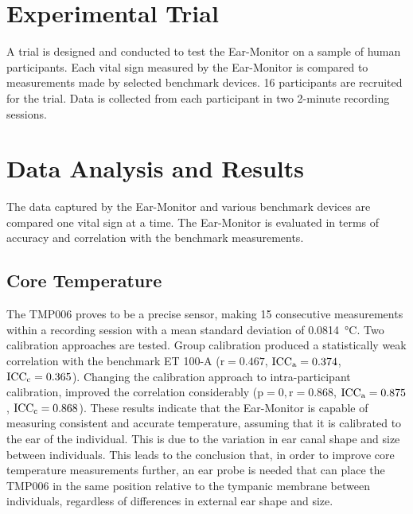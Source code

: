 \section{Experimental Trial}

A trial is designed and conducted to test the Ear-Monitor on a sample of human participants. Each vital sign measured by the Ear-Monitor is compared to measurements made by selected benchmark devices. 16 participants are recruited for the trial. Data is collected from each participant in two 2-minute recording sessions.

\section{Data Analysis and Results}

The data captured by the Ear-Monitor and various benchmark devices are compared one vital sign at a time. The Ear-Monitor is evaluated in terms of accuracy and correlation with the benchmark measurements. %

\subsection{Core Temperature}
The TMP006 proves to be a precise sensor, making 15 consecutive measurements within a recording session with a mean standard deviation of \SI{0.0814}{\celsius}. Two calibration approaches are tested. Group calibration produced a statistically weak correlation with the benchmark ET 100-A ($\text{r}=0.467$, $\text{ICC\textsubscript{a}} = 0.374$, $\text{ICC\textsubscript{c}} = 0.365$). Changing the calibration approach to intra-participant calibration, improved the correlation considerably ($\text{p}=0, \text{r}=0.868$, $\text{ICC\textsubscript{a}} = 0.875$, $\text{ICC\textsubscript{c}} = 0.868$). These results indicate that the Ear-Monitor is capable of measuring consistent and accurate temperature, assuming that it is calibrated to the ear of the individual. This is due to the variation in ear canal shape and size between individuals. This leads to the conclusion that, in order to improve core temperature measurements further, an ear probe is needed that can place the TMP006 in the same position relative to the tympanic membrane between individuals, regardless of differences in external ear shape and size.

